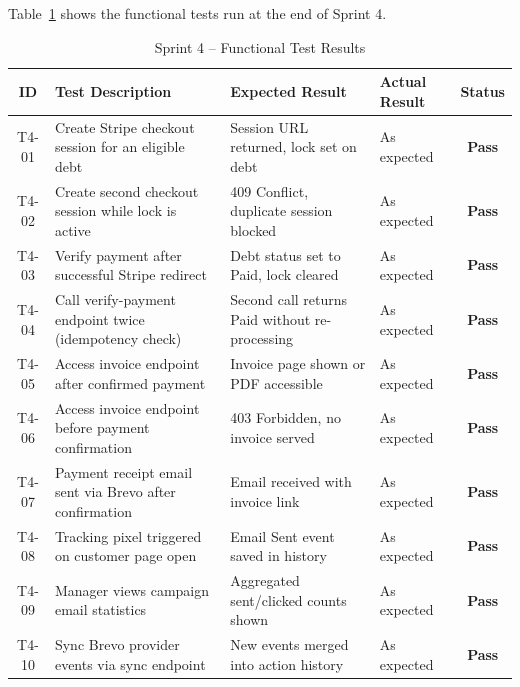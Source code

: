 \documentclass[12pt,a4paper]{report}
\newcommand{\tpass}{\textcolor{passgreen}{\textbf{Pass}}}
\begin{document}
Table~\ref{tab:test-s4} shows the functional tests run at the end of Sprint 4.

\begin{table}[H]
  \centering
  \renewcommand{\arraystretch}{1.3}
  \begin{tabular}{|c|p{4.8cm}|p{4.2cm}|p{2cm}|c|}
    \hline
    \textbf{ID} & \textbf{Test Description} & \textbf{Expected Result} & \textbf{Actual Result} & \textbf{Status} \\
    \hline
    T4-01 & Create Stripe checkout session for an eligible debt       & Session URL returned, lock set on debt       & As expected & \tpass \\
    \hline
    T4-02 & Create second checkout session while lock is active       & 409 Conflict, duplicate session blocked      & As expected & \tpass \\
    \hline
    T4-03 & Verify payment after successful Stripe redirect            & Debt status set to Paid, lock cleared        & As expected & \tpass \\
    \hline
    T4-04 & Call verify-payment endpoint twice (idempotency check)    & Second call returns Paid without re-processing & As expected & \tpass \\
    \hline
    T4-05 & Access invoice endpoint after confirmed payment            & Invoice page shown or PDF accessible         & As expected & \tpass \\
    \hline
    T4-06 & Access invoice endpoint before payment confirmation        & 403 Forbidden, no invoice served             & As expected & \tpass \\
    \hline
    T4-07 & Payment receipt email sent via Brevo after confirmation   & Email received with invoice link             & As expected & \tpass \\
    \hline
    T4-08 & Tracking pixel triggered on customer page open            & Email Sent event saved in history            & As expected & \tpass \\
    \hline
    T4-09 & Manager views campaign email statistics                   & Aggregated sent/clicked counts shown         & As expected & \tpass \\
    \hline
    T4-10 & Sync Brevo provider events via sync endpoint              & New events merged into action history        & As expected & \tpass \\
    \hline
  \end{tabular}
  \caption{Sprint 4 -- Functional Test Results}
  \label{tab:test-s4}
\end{table}
\end{document}
